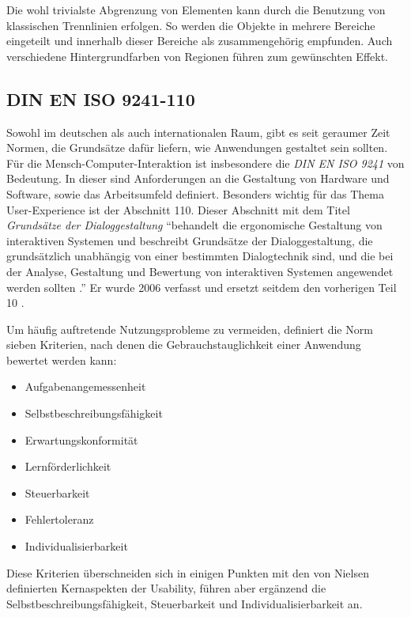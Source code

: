 Die wohl trivialste Abgrenzung von Elementen kann durch die Benutzung von klassischen Trennlinien erfolgen. So werden die Objekte in mehrere Bereiche eingeteilt und innerhalb dieser Bereiche als zusammengehörig empfunden. Auch verschiedene Hintergrundfarben von Regionen führen zum gewünschten Effekt.

\subsection{DIN EN ISO 9241-110} \label{sec:uidNorms}
Sowohl im deutschen als auch internationalen Raum, gibt es seit geraumer Zeit Normen, die Grundsätze dafür liefern, wie Anwendungen gestaltet sein sollten. Für die Mensch-Computer-Interaktion ist insbesondere die \textit{DIN EN ISO 9241} von Bedeutung. In dieser sind Anforderungen an die Gestaltung von Hardware und Software, sowie das Arbeitsumfeld definiert. Besonders wichtig für das Thema User-Experience ist der Abschnitt 110. Dieser Abschnitt mit dem Titel \textit{Grundsätze der Dialoggestaltung} \enquote{behandelt die ergonomische Gestaltung von interaktiven Systemen und beschreibt Grundsätze der Dialoggestaltung, die grundsätzlich unabhängig von einer bestimmten Dialogtechnik sind, und die bei der Analyse, Gestaltung und Bewertung von interaktiven Systemen angewendet werden sollten \cite[S. 4]{DIN2006}.} Er wurde 2006 verfasst und ersetzt seitdem den vorherigen Teil 10 \cite{DIN2006}.\par
Um häufig auftretende Nutzungsprobleme zu vermeiden, definiert die Norm sieben Kriterien, nach denen die Gebrauchstauglichkeit einer Anwendung bewertet werden kann:
\begin{itemize}
	\item Aufgabenangemessenheit
	\item Selbstbeschreibungsfähigkeit
	\item Erwartungskonformität
	\item Lernförderlichkeit
	\item Steuerbarkeit
	\item Fehlertoleranz
	\item Individualisierbarkeit \cite[S. 7]{DIN2006}
\end{itemize}
Diese Kriterien überschneiden sich in einigen Punkten mit den von Nielsen definierten Kernaspekten der Usability, führen aber ergänzend die Selbstbeschreibungsfähigkeit, Steuerbarkeit und Individualisierbarkeit an.\par
